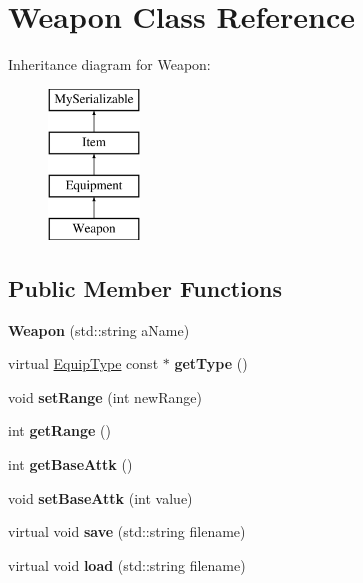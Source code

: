 \hypertarget{class_weapon}{}\section{Weapon Class Reference}
\label{class_weapon}
Inheritance diagram for Weapon\+:\begin{figure}[H]
\begin{center}
\leavevmode
\includegraphics[height=4.000000cm]{class_weapon}
\end{center}
\end{figure}
\subsection*{Public Member Functions}
\begin{DoxyCompactItemize}
\item 
\hypertarget{class_weapon_ad0708441316f06924b0da0c288b99136}{}\label{class_weapon_ad0708441316f06924b0da0c288b99136} 
{\bfseries Weapon} (std\+::string a\+Name)
\item 
\hypertarget{class_weapon_a6b9a83e88b0d07a52ac605bd0044b26a}{}\label{class_weapon_a6b9a83e88b0d07a52ac605bd0044b26a} 
virtual \hyperlink{class_equip_type}{Equip\+Type} const  $\ast$ {\bfseries get\+Type} ()
\item 
\hypertarget{class_weapon_a2014e6757365a58d5d7815a717903347}{}\label{class_weapon_a2014e6757365a58d5d7815a717903347} 
void {\bfseries set\+Range} (int new\+Range)
\item 
\hypertarget{class_weapon_af0d86939f16add54fc7ae87fea85ac21}{}\label{class_weapon_af0d86939f16add54fc7ae87fea85ac21} 
int {\bfseries get\+Range} ()
\item 
\hypertarget{class_weapon_a226746903ddaa7abb177665abd597086}{}\label{class_weapon_a226746903ddaa7abb177665abd597086} 
int {\bfseries get\+Base\+Attk} ()
\item 
\hypertarget{class_weapon_ab23a119713f3e433f0d3e90659ab435d}{}\label{class_weapon_ab23a119713f3e433f0d3e90659ab435d} 
void {\bfseries set\+Base\+Attk} (int value)
\item 
\hypertarget{class_weapon_ae382102dd74948449b7eadbb2f24bc06}{}\label{class_weapon_ae382102dd74948449b7eadbb2f24bc06} 
virtual void {\bfseries save} (std\+::string filename)
\item 
\hypertarget{class_weapon_a541515ce9e8394c01473dd4282cc1dfe}{}\label{class_weapon_a541515ce9e8394c01473dd4282cc1dfe} 
virtual void {\bfseries load} (std\+::string filename)
\end{DoxyCompactItemize}

